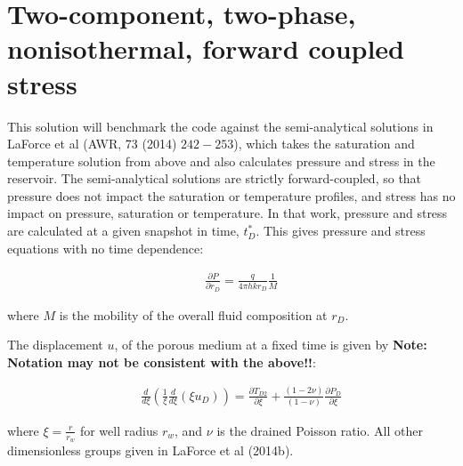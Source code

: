 \documentclass[12pt]{report}
\begin{document}
\section{Two-component, two-phase, nonisothermal, forward coupled stress}

This solution will benchmark the code against the semi-analytical solutions in LaForce et al (AWR, 73 (2014) $242 - 253$), which takes the saturation and temperature solution from above and also calculates pressure and stress in the reservoir.  The semi-analytical solutions are strictly forward-coupled, so that pressure does not impact the saturation or temperature profiles, and stress has no impact on pressure, saturation or temperature. In that work, pressure and stress are calculated at a given snapshot in time, $t_D^*$. This gives pressure and stress equations with no time dependence:

\begin{eqnarray}
&&\frac{\partial P}{\partial r_D} = \frac{q}{4\pi h k r_D}
  \frac{1}{M}\label{eqn:P_again}
\end{eqnarray}

\noindent where $M$ is the mobility of the overall fluid composition
at $r_D$.

The displacement $u$, of the porous medium at a fixed time is given by
{\bf Note: Notation may not be consistent with the above!!}:

\begin{eqnarray}
&&\frac{d}{d \xi}\left(\frac{1}{\xi}\frac{d}{d \xi}(\xi u_D)\right) = \frac{\partial T_{D2}}{\partial \xi}+
\frac{(1-2\nu)}{(1-\nu)}\frac{\partial P_D}{\partial \xi}\label{eqn:disp_u}
\end{eqnarray}

\noindent where $\xi = \frac{r}{r_w}$ for well radius $r_w$, and $\nu$ is the drained Poisson ratio.  All other dimensionless groups given in LaForce et al (2014b).

\end{document}
